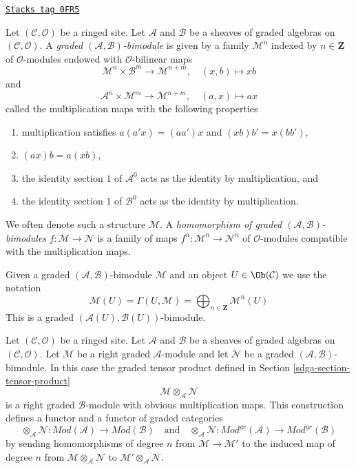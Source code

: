 \begin{definition}[Bimodule]
\label{sdga-definition-bimodule}
\href{https://stacks.math.columbia.edu/tag/0FR5}{\texttt{Stacks tag 0FR5}}

Let $(\mathcal{C}, \mathcal{O})$ be a ringed site. Let $\mathcal{A}$
and $\mathcal{B}$ be a sheaves of graded algebras on
$(\mathcal{C}, \mathcal{O})$. A
{\it graded $(\mathcal{A}, \mathcal{B})$-bimodule}
is given by a family $\mathcal{M}^n$ indexed by $n \in \mathbf{Z}$
of $\mathcal{O}$-modules endowed with $\mathcal{O}$-bilinear maps
$$
\mathcal{M}^n \times \mathcal{B}^m \to \mathcal{M}^{n + m},\quad
(x, b) \longmapsto xb
$$
and
$$
\mathcal{A}^n \times \mathcal{M}^m \to \mathcal{M}^{n + m},\quad
(a, x) \longmapsto ax
$$
called the multiplication maps with the following properties
\begin{enumerate}
\item multiplication satisfies $a(a'x) = (aa')x$ and
$(xb)b' = x(bb')$,
\item $(ax)b = a(xb)$,
\item the identity section $1$ of $\mathcal{A}^0$ acts as the
identity by multiplication, and
\item the identity section $1$ of
$\mathcal{B}^0$ acts as the identity by multiplication.
\end{enumerate}
We often denote such a structure $\mathcal{M}$.
A {\it homomorphism of graded $(\mathcal{A}, \mathcal{B})$-bimodules}
$f : \mathcal{M} \to \mathcal{N}$ is a family of maps
$f^n : \mathcal{M}^n \to \mathcal{N}^n$
of $\mathcal{O}$-modules compatible with the multiplication maps.
\end{definition}

Given a graded $(\mathcal{A}, \mathcal{B})$-bimodule $\mathcal{M}$
and an object $U \in \Ob(\mathcal{C})$ we use the notation
$$
\mathcal{M}(U) =
\Gamma(U, \mathcal{M}) =
\bigoplus\nolimits_{n \in \mathbf{Z}} \mathcal{M}^n(U)
$$
This is a graded $(\mathcal{A}(U), \mathcal{B}(U))$-bimodule.

\medskip\noindent
Let $(\mathcal{C}, \mathcal{O})$ be a ringed site. Let $\mathcal{A}$
and $\mathcal{B}$ be a sheaves of graded algebras on
$(\mathcal{C}, \mathcal{O})$. Let $\mathcal{M}$ be a right
graded $\mathcal{A}$-module and let $\mathcal{N}$ be a
graded $(\mathcal{A}, \mathcal{B})$-bimodule. In this case the
graded tensor product defined in Section \ref{sdga-section-tensor-product}
$$
\mathcal{M} \otimes_\mathcal{A} \mathcal{N}
$$
is a right graded $\mathcal{B}$-module with obvious multiplication maps.
This construction defines a functor and a functor of graded categories
$$
\otimes_\mathcal{A} \mathcal{N} :
\textit{Mod}(\mathcal{A})
\longrightarrow
\textit{Mod}(\mathcal{B})
\quad\text{and}\quad
\otimes_\mathcal{A} \mathcal{N} :
\textit{Mod}^{gr}(\mathcal{A})
\longrightarrow
\textit{Mod}^{gr}(\mathcal{B})
$$
by sending homomorphisms of degree $n$ from $\mathcal{M} \to \mathcal{M}'$
to the induced map of degree $n$ from
$\mathcal{M} \otimes_\mathcal{A} \mathcal{N}$ to
$\mathcal{M}' \otimes_\mathcal{A} \mathcal{N}$.

